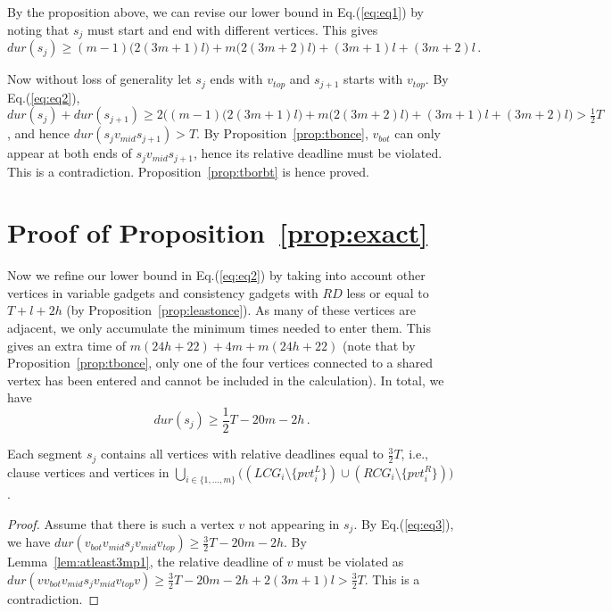 \documentclass[envcountsame]{llncs}
\begin{document}
By the proposition above, we can revise our lower bound in Eq.(\ref{eq:eq1}) by noting that
$s_j$ must start and end with different vertices. This gives
\begin{equation}\label{eq:eq2}
\mathit{dur}(s_j) \geq (m-1)\big(2(3m+1)l\big) + m\big(2(3m+2)l\big) + (3m+1)l + (3m+2)l\,.
\end{equation}

Now without loss of generality let $s_j$ ends with $v_{top}$ and $s_{j+1}$ starts with $v_{top}$.
By Eq.(\ref{eq:eq2}),
$\mathit{dur}(s_j) + \mathit{dur}(s_{j+1}) \geq 2\Big( (m - 1)\big(2(3m+1)l\big) + m\big(2(3m+2)l\big) + (3m+1)l + (3m+2)l \Big) > \frac{1}{2}T$,
and hence $\mathit{dur}(s_j v_{mid} s_{j + 1}) > T$.
By Proposition~\ref{prop:tbonce}, $v_{bot}$ can only appear at both ends of $s_j v_{mid} s_{j + 1}$,
hence its relative deadline must be violated. This is a contradiction. Proposition~\ref{prop:tborbt} is hence proved.

\section{Proof of Proposition~\ref{prop:exact}}\label{app:cnt}


Now we refine our lower bound in Eq.(\ref{eq:eq2}) by taking into account other vertices in variable gadgets
and consistency gadgets with $\mathit{RD}$ less or equal to $T + l + 2h$ (by Proposition~\ref{prop:leastonce}).
As many of these vertices are adjacent, we only accumulate the minimum times needed to enter them.
This gives an extra time of $m(24h + 22) + 4m + m(24h + 22)$ (note that by Proposition~\ref{prop:tbonce},
only one of the four vertices connected to a shared vertex has been entered and cannot be included
in the calculation). In total, we have
\begin{equation}\label{eq:eq3}
\mathit{dur}(s_j) \geq \frac{1}{2}T - 20m - 2h \,.
\end{equation}
 
\begin{proposition}\label{prop:32once}
Each segment $s_j$ contains all vertices with relative deadlines equal to $\frac{3}{2}T$, i.e.,
clause vertices and vertices in
\( \bigcup_{i \in \{1, \ldots, m\}} \big( (\mathit{LCG}_i \setminus \{\mathit{pvt}_i^L\}) \cup (\mathit{RCG}_i \setminus \{ \mathit{pvt}_i^R \} ) \big) \).
\end{proposition}
\begin{proof}
Assume that there is such a vertex $v$ not appearing in $s_j$.
By Eq.(\ref{eq:eq3}), we have $\mathit{dur}(v_{bot} v_{mid} s_j v_{mid} v_{top}) \geq \frac{3}{2}T - 20m - 2h$.
By Lemma~\ref{lem:atleast3mp1}, the relative deadline of $v$ must be violated as
$\mathit{dur}(v v_{bot} v_{mid} s_j v_{mid} v_{top} v) \geq \frac{3}{2}T - 20m - 2h + 2(3m + 1)l > \frac{3}{2}T$. 
This is a contradiction.
\end{proof}
\end{document}
